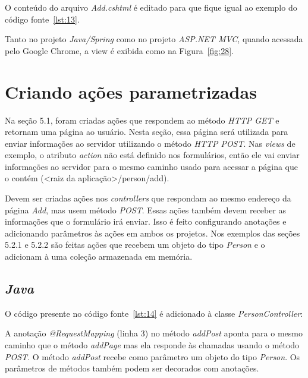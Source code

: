 O conteúdo do arquivo \textit{Add.cshtml} é editado para que fique igual ao exemplo do código fonte~\ref{lst:13}.


Tanto no projeto \textit{Java/Spring} como no projeto \textit{ASP.NET MVC}, quando acessada pelo Google Chrome, a view é exibida como na Figura~\ref{fig:28}. 


\section{Criando ações parametrizadas}

Na seção 5.1, foram criadas ações que respondem ao método \textit{HTTP GET} e retornam uma página ao usuário. Nesta seção, essa página será utilizada para enviar informações ao servidor utilizando o método \textit{HTTP POST}. Nas \textit{views} de exemplo, o atributo \textit{action} não está definido nos formulários, então ele vai enviar informações ao servidor para o mesmo caminho usado para acessar a página que o contém (<raiz da aplicação>/person/add).

Devem ser criadas ações nos \textit{controllers} que respondam ao mesmo endereço da página \textit{Add}, mas usem método \textit{POST}. Essas ações também devem receber as informações que o formulário irá enviar. Isso é feito configurando anotações e adicionando parâmetros às ações em ambos os projetos. Nos exemplos das seções 5.2.1 e 5.2.2 são feitas ações que recebem um objeto do tipo \textit{Person} e o adicionam à uma coleção armazenada em memória.

\subsection{\textit{Java}}

O código presente no código fonte~\ref{lst:14} é adicionado à classe \textit{PersonController}:


A anotação \textit{@RequestMapping} (linha 3) no método \textit{addPost} aponta para o mesmo caminho que o método \textit{addPage} mas ela responde às chamadas usando o método \textit{POST}. O método \textit{addPost} recebe como parâmetro um objeto do tipo \textit{Person}. Os parâmetros de métodos também podem ser decorados com anotações.

